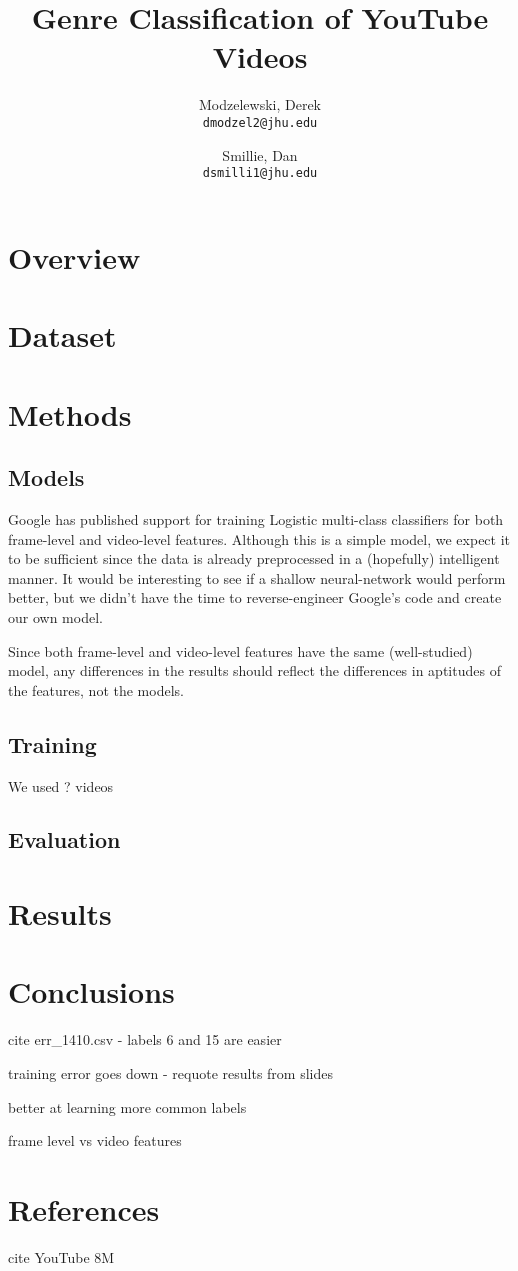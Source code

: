 \documentclass{article}
\title{Genre Classification of YouTube Videos}
\author{
  Modzelewski, Derek\\
  \texttt{dmodzel2@jhu.edu}
  \and
  Smillie, Dan\\
  \texttt{dsmilli1@jhu.edu}
}
\begin{document}
\maketitle

\tableofcontents

\section{Overview} %

\section{Dataset} %

\section{Methods} %

\subsection{Models}

Google has published support for training Logistic multi-class classifiers for both frame-level and video-level features. Although this is a simple model, we expect it to be sufficient since the data is already preprocessed in a (hopefully) intelligent manner. It would be interesting to see if a shallow neural-network would perform better, but we didn't have the time to reverse-engineer Google's code and create our own model.

Since both frame-level and video-level features have the same (well-studied) model, any differences in the results should reflect the differences in aptitudes of the features, not the models.

\subsection{Training}

We used ? videos

\subsection{Evaluation}


\section{Results}

\section{Conclusions}

cite err_1410.csv - labels 6 and 15 are easier

training error goes down - requote results from slides

better at learning more common labels

frame level vs video features

\section{References}

cite YouTube 8M






%
\end{document}
